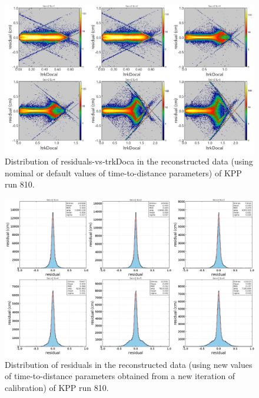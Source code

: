 \documentclass[12pt]{article}
\begin{document}
\begin{figure}[H]
    \centering
    \includegraphics[width=1.0\textwidth]{Figures/residual_vs_trkDoca_defaultT2D_automatedT0.png}
    \caption{Distribution of residuals-vs-trkDoca in the reconstructed data (using nominal or default values of time-to-distance parameters) of KPP run 810.}
    \label{fResidualsVsDocaDefAllSL}
\end{figure}


\begin{figure}[H]
    \centering
    \includegraphics[width=1.0\textwidth]{Figures/residual_Iter2NwDef3T0nw5n.png}
    \caption{Distribution of residuals in the reconstructed data (using new values of time-to-distance parameters obtained from a new iteration of calibration) of KPP run 810.}
    \label{fResidualsDefAllSLiter1}
\end{figure}
\end{document}
